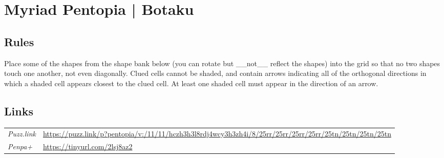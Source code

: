 \section[Myriad Pentopia | Botaku {[\emph{Pentopia (Custom Shape Bank, No Reflection)}]}]{Myriad Pentopia | {\normalfont Botaku}}
\label{sec:42-myriad-pentopia-botaku}

\subsection*{Rules}
\begin{markdown}
Place some of the shapes from the shape bank below (you can rotate but __not__ reflect the shapes) into the grid so that no two shapes touch one another, not even diagonally. Clued cells cannot be shaded, and contain arrows indicating all of the orthogonal directions in which a shaded cell appears closest to the clued cell. At least one shaded cell must appear in the direction of an arrow.
\end{markdown}
\subsection*{Links}
\begin{tabularx}{\textwidth}{l X}
\emph{Puzz.link} & \url{https://puzz.link/p?pentopia/v:/11/11/hczh3h3l8rdj4wcy3h3zh4i/8/25rr/25rr/25rr/25rr/25tn/25tn/25tn/25tn} \\
\emph{Penpa+} & \url{https://tinyurl.com/2lsj8az2} \\
\end{tabularx}
\pagebreak
